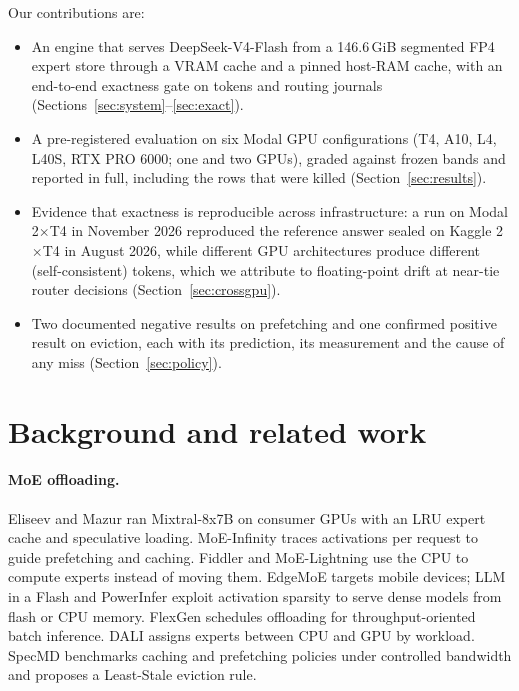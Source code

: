 \documentclass[11pt]{article}
\begin{document}
Our contributions are:
\begin{itemize}
\item An engine that serves DeepSeek-V4-Flash from a 146.6\,GiB segmented FP4
expert store through a VRAM cache and a pinned host-RAM cache, with an
end-to-end exactness gate on tokens and routing journals (Sections~\ref{sec:system}--\ref{sec:exact}).
\item A pre-registered evaluation on six Modal GPU configurations (T4, A10, L4,
L40S, RTX PRO 6000; one and two GPUs), graded against frozen bands and
reported in full, including the rows that were killed (Section~\ref{sec:results}).
\item Evidence that exactness is reproducible across infrastructure: a run on
Modal 2$\times$T4 in November 2026 reproduced the reference answer sealed on
Kaggle 2$\times$T4 in August 2026, while different GPU architectures
produce different (self-consistent) tokens, which we attribute to
floating-point drift at near-tie router decisions (Section~\ref{sec:crossgpu}).
\item Two documented negative results on prefetching and one confirmed positive
result on eviction, each with its prediction, its measurement and the cause of
any miss (Section~\ref{sec:policy}).
\end{itemize}

\section{Background and related work}\label{sec:related}

\paragraph{MoE offloading.}
Eliseev and Mazur \citep{eliseev2023mixtral} ran Mixtral-8x7B on consumer GPUs
with an LRU expert cache and speculative loading. MoE-Infinity
\citep{xue2024moeinfinity} traces activations per request to guide prefetching
and caching. Fiddler \citep{kamahori2024fiddler} and MoE-Lightning
\citep{cao2024moelightning} use the CPU to compute experts instead of moving
them. EdgeMoE \citep{yi2023edgemoe} targets mobile devices; LLM in a Flash
\citep{alizadeh2024llminaflash} and PowerInfer \citep{song2024powerinfer} exploit
activation sparsity to serve dense models from flash or CPU memory. FlexGen
\citep{sheng2023flexgen} schedules offloading for throughput-oriented batch
inference. DALI \citep{zhu2026dali} assigns experts between CPU and GPU by
workload. SpecMD \citep{hoang2026specmd} benchmarks caching and prefetching
policies under controlled bandwidth and proposes a Least-Stale eviction rule.
\end{document}
